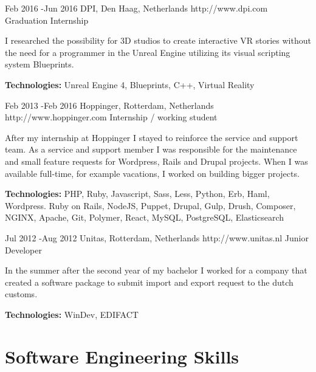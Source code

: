 \documentclass[10pt]{article} %
\begin{document}
\job
{Feb 2016 -}{Jun 2016}
{DPI, Den Haag, Netherlands}
{http://www.dpi.com}
{Graduation Internship}
{I researched the possibility for 3D studios to create interactive VR stories without the need for a programmer in the Unreal Engine utilizing its visual scripting system Blueprints.\\

\rule{0mm}{5mm}\textbf{Technologies:} Unreal Engine 4, Blueprints, C++, Virtual Reality}

\job
{Feb 2013 -}{Feb 2016}
{Hoppinger, Rotterdam, Netherlands}
{http://www.hoppinger.com}
{Internship / working student}
{After my internship at Hoppinger I stayed to reinforce the service and support team. As a service and support member I was responsible for the maintenance and small feature requests for Wordpress, Rails and Drupal projects. When I was available full-time, for example vacations, I worked on building bigger projects.

\rule{0mm}{5mm}\textbf{Technologies:} PHP, Ruby, Javascript, Sass, Less, Python, Erb, Haml, Wordpress. Ruby on Rails, NodeJS, Puppet, Drupal, Gulp, Drush, Composer, NGINX, Apache, Git, Polymer, React, MySQL, PostgreSQL, Elasticsearch
}

\job
{Jul 2012 -}{Aug 2012}
{Unitas, Rotterdam, Netherlands}
{http://www.unitas.nl}
{Junior Developer}
{In the summer after the second year of my bachelor I worked for a company that created a software package to submit import and export request to the dutch customs.

\rule{0mm}{5mm}\textbf{Technologies:} WinDev, EDIFACT
}


\section{Software Engineering Skills}

\end{document}
